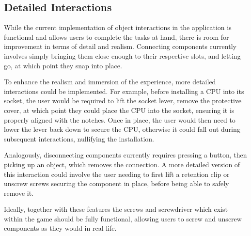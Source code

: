 \subsection{Detailed Interactions}
\label{sec:PlannedDetailedInteractions}

While the current implementation of object interactions in the application is functional and allows users to complete the tasks at hand, there is room for improvement in terms of detail and realism.
Connecting components currently involves simply bringing them close enough to their respective slots, and letting go, at which point they snap into place.

To enhance the realism and immersion of the experience, more detailed interactions could be implemented.
For example, before installing a CPU into its socket, the user would be required to lift the socket lever, remove the protective cover, at which point they could place the CPU into the socket, ensuring it is properly aligned with the notches.
Once in place, the user would then need to lower the lever back down to secure the CPU, otherwise it could fall out during subsequent interactions, nullifying the installation.

Analogously, disconnecting components currently requires pressing a button, then picking up an object, which removes the connection.
A more detailed version of this interaction could involve the user needing to first lift a retention clip or unscrew screws securing the component in place, before being able to safely remove it.

Ideally, together with these features the screws and screwdriver which exist within the game should be fully functional, allowing users to screw and unscrew components as they would in real life.